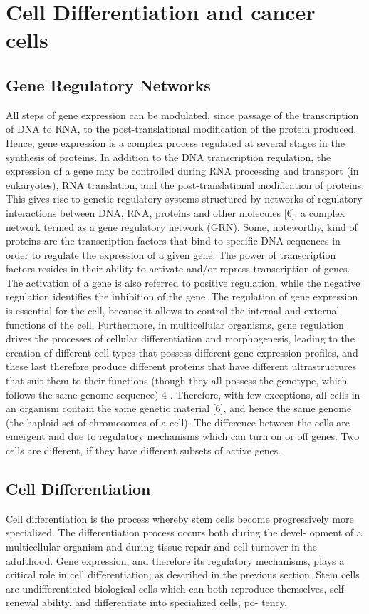 \chapter{Cell Differentiation and cancer cells}\label{celldiff}
\lhead[\fancyplain{}{\bfseries\thepage}]{\fancyplain{}{\bfseries\rightmark}}


\section{Gene Regulatory Networks}

All steps of gene expression can be modulated, since passage of the transcription of DNA to RNA, to the post-translational modification of the protein
produced. Hence, gene expression is a complex process regulated at several stages in the synthesis of proteins. In addition to the DNA transcription regulation, the expression of a gene may be controlled during RNA processing and transport (in eukaryotes), RNA translation, and the post-translational modification of proteins. This gives rise to genetic regulatory systems structured by networks of regulatory interactions between DNA, RNA, proteins and other molecules [6]: a complex network termed as a gene regulatory
network (GRN). Some, noteworthy, kind of proteins are the transcription factors that bind to specific DNA sequences in order to regulate the
expression of a given gene. The power of transcription factors resides in their ability to activate and/or repress transcription of genes. The activation of
a gene is also referred to positive regulation, while the negative regulation
identifies the inhibition of the gene.
The regulation of gene expression is essential for the cell, because it
allows to control the internal and external functions of the cell. Furthermore,
in multicellular organisms, gene regulation drives the processes of cellular
differentiation and morphogenesis, leading to the creation of different cell
types that possess different gene expression profiles, and these last therefore
produce different proteins that have different ultrastructures that suit them
to their functions (though they all possess the genotype, which follows the
same genome sequence) 4 . Therefore, with few exceptions, all cells in an
organism contain the same genetic material [6], and hence the same genome
(the haploid set of chromosomes of a cell). The difference between the cells
are emergent and due to regulatory mechanisms which can turn on or off
genes. Two cells are different, if they have different subsets of active genes.

\section{Cell Differentiation}
Cell differentiation is the process whereby stem cells become progressively
more specialized. The differentiation process occurs both during the devel-
opment of a multicellular organism and during tissue repair and cell turnover
in the adulthood. Gene expression, and therefore its regulatory mechanisms,
plays a critical role in cell differentiation; as described in the previous section.
Stem cells are undifferentiated biological cells which can both reproduce
themselves, self-renewal ability, and differentiate into specialized cells, po-
tency.
